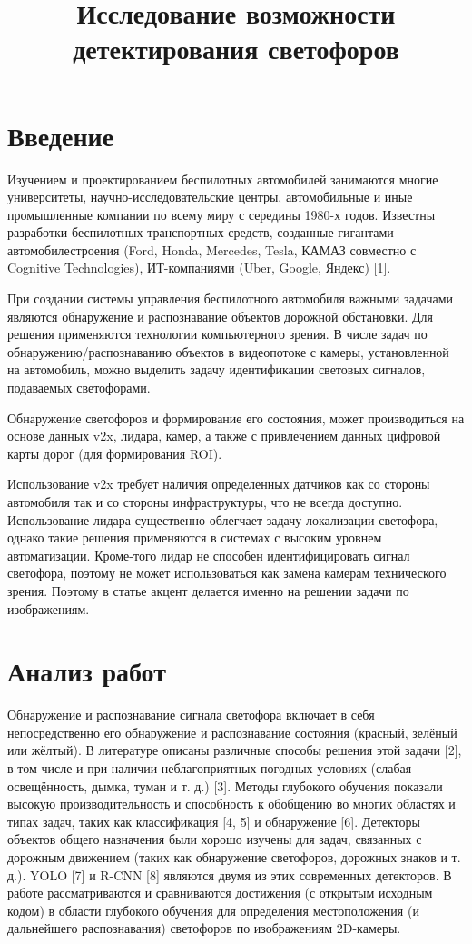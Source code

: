 \documentclass{misisarticle}
\title{Исследование возможности детектирования светофоров}
\begin{document}
\maketitle

\section{Введение}

Изучением и проектированием беспилотных автомобилей занимаются многие университеты, научно-исследовательские центры, автомобильные и иные промышленные компании по всему миру с середины 1980-х годов. Известны разработки беспилотных транспортных средств, созданные гигантами автомобилестроения (Ford, Honda, Mercedes, Tesla, КАМАЗ совместно с Cognitive Technologies), ИТ-компаниями (Uber, Google, Яндекс) [1].

При создании системы управления беспилотного автомобиля важными задачами являются обнаружение и распознавание объектов дорожной обстановки. Для решения применяются технологии компьютерного зрения. В числе задач по обнаружению/распознаванию объектов в видеопотоке с камеры, установленной на автомобиль, можно выделить задачу идентификации световых сигналов, подаваемых светофорами.

Обнаружение светофоров и формирование его состояния, может производиться на основе данных v2x, лидара, камер, а также с привлечением данных цифровой карты дорог (для формирования ROI).

Использование v2x требует наличия определенных датчиков как со стороны автомобиля так и со стороны инфраструктуры, что не всегда доступно.
Использование лидара существенно облегчает задачу локализации светофора, однако такие решения применяются в системах с высоким уровнем автоматизации. Кроме-того лидар не способен идентифицировать сигнал светофора, поэтому не может использоваться как замена камерам технического зрения. Поэтому в статье акцент делается именно на решении задачи по изображениям.
\section{Анализ работ}
Обнаружение и распознавание сигнала светофора включает в себя непосредственно его обнаружение и распознавание состояния (красный, зелёный или жёлтый). В литературе описаны различные способы решения этой задачи [2], в том числе и при наличии неблагоприятных погодных условиях (слабая освещённость, дымка, туман и т. д.) [3].
Методы глубокого обучения показали высокую производительность и способность к обобщению во многих областях и типах задач, таких как классификация [4, 5] и обнаружение [6]. Детекторы объектов общего назначения были хорошо изучены для задач, связанных с дорожным движением (таких как обнаружение светофоров, дорожных знаков и т. д.). YOLO [7] и R-CNN [8] являются двумя из этих современных детекторов. В работе рассматриваются и сравниваются достижения (с открытым исходным кодом) в области глубокого обучения для определения местоположения (и дальнейшего распознавания) светофоров по изображениям 2D-камеры.
\end{document}
